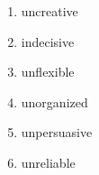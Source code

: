 \documentclass[a4paper,14pt]{extreport}
\newlength{\mylength}
\newcommand*\circled[2][draw=blue]{\savebox\mybox{\vbox{\vphantom{WL1/}#1}}\setlength\mylength{\dimexpr\CircleFactor\dimexpr\ht\mybox+\dp\mybox\relax\relax}\tikzset{mystyle/.style={circle,#1,minimum height={\mylength}}}
  \tikz[baseline=(char.base)]
  \node[mystyle] (char) {#2};}
\begin{document}
\vspace{1cm}
\begin{multicols}{2}
    \begin{enumerate}
    \item uncreative
    \item indecisive
    \item unflexible
    \item unorganized
    \item unpersuasive
    \item unreliable
    \end{enumerate}
\end{multicols}









\end{document}
